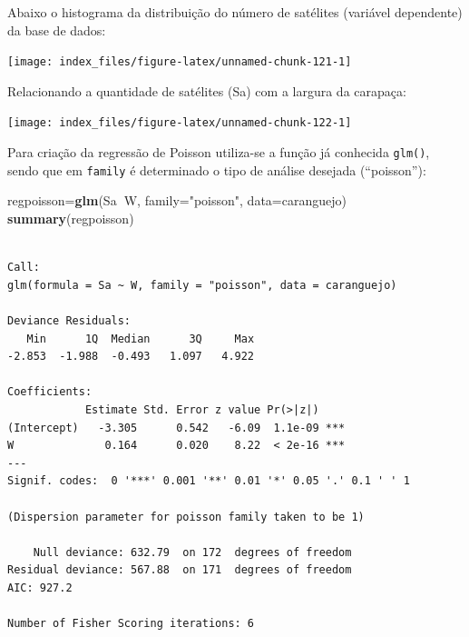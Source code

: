 \documentclass[12pt,brazil,oneside]{book}
\newenvironment{Shaded}{\begin{snugshade}}{\end{snugshade}}
\newcommand{\DataTypeTok}[1]{\textcolor[rgb]{0.13,0.29,0.53}{#1}}
\newcommand{\KeywordTok}[1]{\textcolor[rgb]{0.13,0.29,0.53}{\textbf{#1}}}
\newcommand{\NormalTok}[1]{#1}
\newcommand{\OperatorTok}[1]{\textcolor[rgb]{0.81,0.36,0.00}{\textbf{#1}}}
\newcommand{\StringTok}[1]{\textcolor[rgb]{0.31,0.60,0.02}{#1}}
\begin{document}
Abaixo o histograma da distribuição do número de satélites (variável dependente) da base de dados:

\begin{Shaded}
\end{Shaded}

\begin{center}\texttt{[image: index\_files/figure-latex/unnamed-chunk-121-1]} \end{center}

Relacionando a quantidade de satélites (Sa) com a largura da carapaça:

\begin{Shaded}
\end{Shaded}

\begin{center}\texttt{[image: index\_files/figure-latex/unnamed-chunk-122-1]} \end{center}

Para criação da regressão de Poisson utiliza-se a função já conhecida \texttt{glm()}, sendo que em \texttt{family} é determinado o tipo de análise desejada (``poisson''):

\begin{Shaded}
\begin{Highlighting}[]
\NormalTok{regpoisson=}\KeywordTok{glm}\NormalTok{(Sa}\OperatorTok{~}\NormalTok{W, }\DataTypeTok{family=}\StringTok{"poisson"}\NormalTok{, }\DataTypeTok{data=}\NormalTok{caranguejo)}
\KeywordTok{summary}\NormalTok{(regpoisson)}
\end{Highlighting}
\end{Shaded}

\begin{verbatim}

Call:
glm(formula = Sa ~ W, family = "poisson", data = caranguejo)

Deviance Residuals: 
   Min      1Q  Median      3Q     Max  
-2.853  -1.988  -0.493   1.097   4.922  

Coefficients:
            Estimate Std. Error z value Pr(>|z|)    
(Intercept)   -3.305      0.542   -6.09  1.1e-09 ***
W              0.164      0.020    8.22  < 2e-16 ***
---
Signif. codes:  0 '***' 0.001 '**' 0.01 '*' 0.05 '.' 0.1 ' ' 1

(Dispersion parameter for poisson family taken to be 1)

    Null deviance: 632.79  on 172  degrees of freedom
Residual deviance: 567.88  on 171  degrees of freedom
AIC: 927.2

Number of Fisher Scoring iterations: 6
\end{verbatim}
\end{document}
